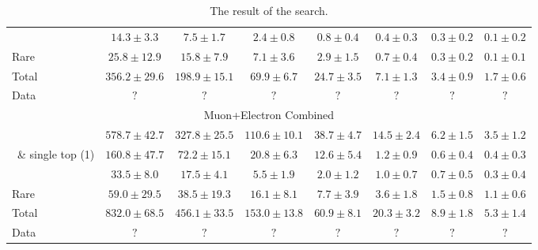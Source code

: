 \begin{table}[!h]
\begin{center}
{\begin{tabular}{l||c|c|c|c|c|c|c}
	\wjets\ 		&$	14.3	\pm	3.3	$&$	7.5	\pm	1.7	$&$	2.4	\pm	0.8	$&$	0.8	\pm	0.4	$&$	0.4	\pm	0.3	$&$	0.3	\pm	0.2	$&$	0.1	\pm	0.2	$	\\
	Rare 		&$	25.8	\pm	12.9	$&$	15.8	\pm	7.9	$&$	7.1	\pm	3.6	$&$	2.9	\pm	1.5	$&$	0.7	\pm	0.4	$&$	0.3	\pm	0.2	$&$	0.1	\pm	0.1	$	\\
	\hline																															
	Total 		&$	356.2	\pm	29.6	$&$	198.9	\pm	15.1	$&$	69.9	\pm	6.7	$&$	24.7	\pm	3.5	$&$	7.1	\pm	1.3	$&$	3.4	\pm	0.9	$&$	1.7	\pm	0.6	$	\\
	\hline																															
	\hline																															
	Data 		&$	?			$&$	?			$&$	?			$&$	?			$&$	?			$&$	?			$&$	?			$	\\
	\hline																															
	\hline																															
	\hline																															
	\multicolumn{8}{c}{Muon+Electron Combined}		\\																													
	\hline																															
	\ttdl\  		&$	578.7	\pm	42.7	$&$	327.8	\pm	25.5	$&$	110.6	\pm	10.1	$&$	38.7	\pm	4.7	$&$	14.5	\pm	2.4	$&$	6.2	\pm	1.5	$&$	3.5	\pm	1.2	$	\\
	\ttsl\ \& single top (1\Lep) 		&$	160.8	\pm	47.7	$&$	72.2	\pm	15.1	$&$	20.8	\pm	6.3	$&$	12.6	\pm	5.4	$&$	1.2	\pm	0.9	$&$	0.6	\pm	0.4	$&$	0.4	\pm	0.3	$	\\
	\wjets\ 		&$	33.5	\pm	8.0	$&$	17.5	\pm	4.1	$&$	5.5	\pm	1.9	$&$	2.0	\pm	1.2	$&$	1.0	\pm	0.7	$&$	0.7	\pm	0.5	$&$	0.3	\pm	0.4	$	\\
	Rare 		&$	59.0	\pm	29.5	$&$	38.5	\pm	19.3	$&$	16.1	\pm	8.1	$&$	7.7	\pm	3.9	$&$	3.6	\pm	1.8	$&$	1.5	\pm	0.8	$&$	1.1	\pm	0.6	$	\\
	\hline																															
	Total 		&$	832.0	\pm	68.5	$&$	456.1	\pm	33.5	$&$	153.0	\pm	13.8	$&$	60.9	\pm	8.1	$&$	20.3	\pm	3.2	$&$	8.9	\pm	1.8	$&$	5.3	\pm	1.4	$	\\
	\hline																															
	\hline																															
	Data 		&$	?			$&$	?			$&$	?			$&$	?			$&$	?			$&$	?			$&$	?			$	\\
	\hline																															

							\end{tabular}}																															
\caption{The result of the search.	
\label{tab:result}}																														
	\end{center}																															
	\end{table}																															
